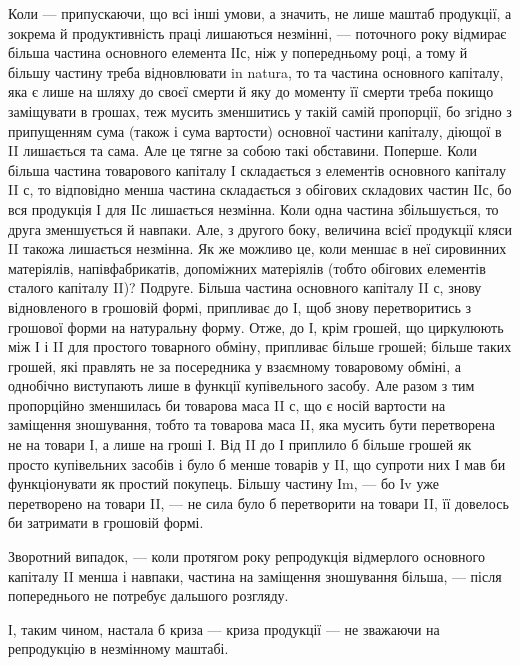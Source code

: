 Коли — припускаючи, що всі інші умови, а значить, не лише маштаб
продукції, а зокрема й продуктивність праці лишаються незмінні, —
поточного року відмирає більша частина основного елемента ІІс, ніж у
попередньому році, а тому й більшу частину треба відновлювати in
natura, то та частина основного капіталу, яка є лише на шляху до своєї
смерти й яку до моменту її смерти треба покищо заміщувати в грошах,
теж мусить зменшитись у такій самій пропорції, бо згідно з припущенням
сума (також і сума вартости) основної частини капіталу, діющої в II
лишається та сама. Але це тягне за собою такі обставини. Поперше. Коли
більша частина товарового капіталу І складається з елементів основного
капіталу II с, то відповідно менша частина складається з обігових складових
частин ІІс, бо вся продукція І для ІІс лишається незмінна. Коли одна
частина збільшується, то друга зменшується й навпаки. Але, з другого
боку, величина всієї продукції кляси II такожа лишається незмінна. Як
же можливо це, коли меншає в неї сировинних матеріялів, напівфабрикатів,
допоміжних матеріялів (тобто обігових елементів сталого капіталу II)?
Подруге. Більша частина основного капіталу II с, знову відновленого в
грошовій формі, припливає до І, щоб знову перетворитись з грошової
форми на натуральну форму. Отже, до І, крім грошей, що циркулюють
між І і II для простого товарного обміну, припливає більше грошей;
більше таких грошей, які правлять не за посередника у взаємному товаровому
обміні, а однобічно виступають лише в функції купівельного
засобу. Але разом з тим пропорційно зменшилась би товарова маса
II с, що є носій вартости на заміщення зношування, тобто та товарова
маса II, яка мусить бути перетворена не на товари І, а лише на гроші І.
Від II до І приплило б більше грошей як просто купівельних засобів і
було б менше товарів у II, що супроти них І мав би функціонувати як
простий покупець. Більшу частину Іm, — бо Іv уже перетворено на товари
II, — не сила було б перетворити на товари II, її довелось би затримати в
грошовій формі.

Зворотний випадок, — коли протягом року репродукція відмерлого
основного капіталу II менша і навпаки, частина на заміщення зношування
більша, — після попереднього не потребує дальшого розгляду.

І, таким чином, настала б криза — криза продукції — не зважаючи на
репродукцію в незмінному маштабі.
